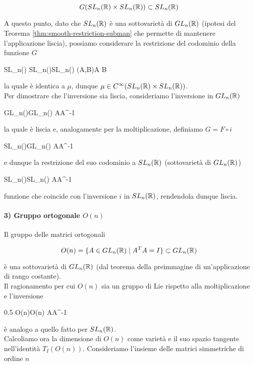 \begin{equation}
	G(SL_{n}(\mathbb{R}) \times SL_{n}(\mathbb{R})) \subset SL_{n}(\mathbb{R})
\end{equation}

A questo punto, dato che $ SL_{n}(\mathbb{R}) $ è una sottovarietà di $ GL_{n}(\mathbb{R}) $ (ipotesi del Teorema \ref{thm:smooth-restriction-subman} che permette di mantenere l'applicazione liscia), possiamo considerare la restrizione del codominio della funzione $ G $

	{SL_{n}(\R) \times SL_{n}(\R)}{SL_{n}(\R)}
	{(A,B)}{A B}

la quale è identica a $ \mu $, dunque $ \mu \in C^{\infty}(SL_{n}(\mathbb{R}) \times SL_{n}(\mathbb{R})) $.\\
Per dimostrare che l'inversione sia liscia, consideriamo l'inversione in $ GL_{n}(\mathbb{R}) $

	{GL_{n}(\R)}{GL_{n}(\R)}
	{A}{A^{-1}}

la quale è liscia e, analogamente per la moltiplicazione, definiamo $ G = F \circ i $

	{SL_{n}(\R)}{GL_{n}(\R)}
	{A}{A^{-1}}

e dunque la restrizione del suo codominio a $ SL_{n}(\mathbb{R}) $ (sottovarietà di $ GL_{n}(\mathbb{R}) $)

	{SL_{n}(\R)}{SL_{n}(\R)}
	{A}{A^{-1}}

funzione che coincide con l'inversione $ i $ in $ SL_{n}(\mathbb{R}) $, rendendola dunque liscia.

\paragraph{3) Gruppo ortogonale $ O(n) $}\label{ex:on-group-lie}

Il gruppo delle matrici ortogonali

\begin{equation}
	O(n) = \{ A \in GL_{n}(\mathbb{R}) \mid A^{T} A = I \} \subset GL_{n}(\mathbb{R})
\end{equation}

è una sottovarietà di $ GL_{n}(\mathbb{R}) $ (dal teorema della preimmagine di un'applicazione di rango costante).\\
Il ragionamento per cui $ O(n) $ sia un gruppo di Lie rispetto alla moltiplicazione e l'inversione

	{0.5}{%
				{O(n)}{O(n)}
				{A}{A^{-1}}
			}

è analogo a quello fatto per $ SL_{n}(\mathbb{R}) $.\\
Calcoliamo ora la dimensione di $ O(n) $ come varietà e il suo spazio tangente nell'identità $ T_{I}(O(n)) $. Consideriamo l'insieme delle matrici simmetriche di ordine $ n $

